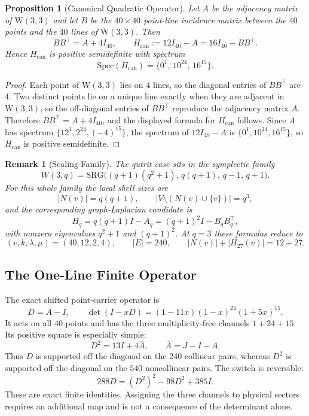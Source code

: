 \documentclass[12pt,a4paper]{article}
\newtheorem{proposition}[theorem]{Proposition}
\newtheorem{remark}[theorem]{Remark}
\newcommand{\W}{\mathrm{W}(3,3)}
\newcommand{\SRG}{\mathrm{SRG}}
\begin{document}
\begin{proposition}[Canonical Quadratic Operator]
\label{prop:canonical-qutrit-operator}
Let $A$ be the adjacency matrix of $\W$ and let $B$ be the $40 \times 40$
point-line incidence matrix between the $40$ points and the $40$ lines of
$\W$. Then
\[
  B B^\top = A + 4 I_{40},
  \qquad
  H_{\mathrm{can}} := 12 I_{40} - A = 16 I_{40} - B B^\top.
\]
Hence $H_{\mathrm{can}}$ is positive semidefinite with spectrum
\[
  \mathrm{Spec}(H_{\mathrm{can}}) = \{0^1,\,10^{24},\,16^{15}\}.
\]
\end{proposition}

\begin{proof}
Each point of $\W$ lies on $4$ lines, so the diagonal entries of
$B B^\top$ are $4$. Two distinct points lie on a unique line exactly when they
are adjacent in $\W$, so the off-diagonal entries of $B B^\top$ reproduce the
adjacency matrix $A$. Therefore $B B^\top = A + 4 I_{40}$, and the displayed
formula for $H_{\mathrm{can}}$ follows. Since $A$ has spectrum
$\{12^1,2^{24},(-4)^{15}\}$, the spectrum of $12 I_{40} - A$ is
$\{0^1,10^{24},16^{15}\}$, so $H_{\mathrm{can}}$ is positive semidefinite.
\end{proof}

\begin{remark}[Scaling Family]
\label{rem:w3q-scaling-family}
The qutrit case sits in the symplectic family
\[
  W(3,q) = \SRG\bigl((q+1)(q^2+1),\, q(q+1),\, q-1,\, q+1\bigr).
\]
For this whole family the local shell sizes are
\[
  |N(v)| = q(q+1),
  \qquad
  |V \setminus (N(v) \cup \{v\})| = q^3,
\]
and the corresponding graph-Laplacian candidate is
\[
  H_q = q(q+1) I - A_q = (q+1)^2 I - B_q B_q^\top,
\]
with nonzero eigenvalues $q^2+1$ and $(q+1)^2$. At $q=3$ these formulas reduce
to
\[
  (v,k,\lambda,\mu) = (40,12,2,4),
  \qquad
  |E| = 240,
  \qquad
  |N(v)| + |H_{27}(v)| = 12 + 27.
\]
\end{remark}

\subsection{The One-Line Finite Operator}

The exact shifted point-carrier operator is
\begin{equation}\label{eq:oneline}
  D=A-I,\qquad
  \boxed{\det(I-xD)=(1-11x)(1-x)^{24}(1+5x)^{15}.}
\end{equation}
It acts on all $40$ points and has the three multiplicity-free channels
$1+24+15$.  Its positive square is especially simple:
\[
  D^2=13I+4\overline A,
  \qquad \overline A=J-I-A.
\]
Thus $D$ is supported off the diagonal on the $240$ collinear pairs,
whereas $D^2$ is supported off the diagonal on the $540$ noncollinear %
pairs.  The switch is reversible:
\[
  288D=(D^2)^2-98D^2+385I.
\]
These are exact finite identities.  Assigning the three channels to
physical sectors requires an additional map and is not a consequence of
the determinant alone.
\end{document}
